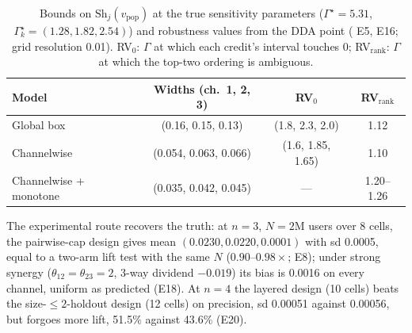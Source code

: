 \begin{table}[htbp]
\centering\small
\caption{Bounds on $\mathrm{Sh}_j(v_{\mathrm{pop}})$ at the true sensitivity parameters ($\Gamma^\star = 5.31$, $\Gamma_k^\star = (1.28, 1.82, 2.54)$) and robustness values from the DDA point ( E5, E16; grid resolution 0.01). RV$_0$: $\Gamma$ at which each credit's interval touches 0; RV$_{\mathrm{rank}}$: $\Gamma$ at which the top-two ordering is ambiguous.}
\label{attr:tab:gamma}
\begin{tabular}{lccc}
\toprule
Model & Widths (ch.\ 1, 2, 3) & RV$_0$ & RV$_{\mathrm{rank}}$ \\
\midrule
Global box & (0.16, 0.15, 0.13) & (1.8, 2.3, 2.0) & 1.12 \\
Channelwise & (0.054, 0.063, 0.066) & (1.6, 1.85, 1.65) & 1.10 \\
Channelwise + monotone & (0.035, 0.042, 0.045) & --- & 1.20--1.26 \\
\bottomrule
\end{tabular}
\end{table}

The experimental route recovers the truth: at $n = 3$, $N = 2$M users over 8 cells, the pairwise-cap design gives mean $(0.0230, 0.0220, 0.0001)$ with sd 0.0005, equal to a two-arm lift test with the same $N$ ($0.90$--$0.98\times$; E8); under strong synergy ($\theta_{12} = \theta_{23} = 2$, 3-way dividend $-0.019$) its bias is 0.0016 on every channel, uniform as predicted (E18). At $n = 4$ the layered design (10 cells) beats the size-$\le 2$-holdout design (12 cells) on precision, sd 0.00051 against 0.00056, but forgoes more lift, 51.5\% against 43.6\% (E20).

